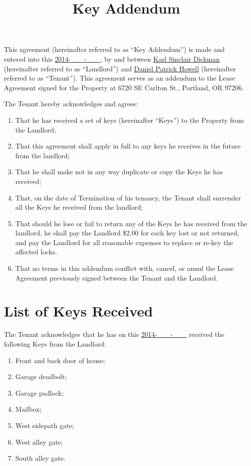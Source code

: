 \documentclass{amsart}
\title{Key Addendum}
\begin{document}
\maketitle
This agreement (hereinafter referred to as ``Key Addendum'') is made and entered
into this \underline{2014-\ \ \ \ -\ \ \ \ }, by and between \underline{Karl
Sinclair Dickman} (hereinafter referred to as ``Landlord'') and
\underline{Daniel Patrick Howell} (hereinafter referred to as ``Tenant''). This
agreement serves as an addendum to the Lease Agreement signed for the Property
at 6720 SE Carlton St., Portland, OR 97206.

The Tenant hereby acknowledges and agrees:
\begin{enumerate}
    \item That he has received a set of keys (hereinafter ``Keys'') to the Property
        from the Landlord;
    \item That this agreement shall apply in full to any keys he receives in the
        future from the landlord;
    \item That he shall make not in any way duplicate or copy the Keys he has
        received;
    \item That, on the date of Termination of his tenancy, the Tenant shall
        surrender all the Keys he received from the landlord;
    \item That should he lose or fail to return any of the Keys he has received
        from the landlord, he shall pay the Landlord \$2.00 for each key lost or
        not returned, and pay the Landlord for all reasonable expenses to
        replace or re-key the affected locks.
    \item That no terms in this addendum conflict with, cancel, or annul the
        Lease Agreement previously signed between the Tenant and the Landlord.
\end{enumerate}
\section*{List of Keys Received}
The Tenant acknowledges that he has on this \underline{2014-\ \ \ \ -\ \ \ \ }
received the following Keys from the Landlord:
\begin{enumerate}
    \item Front and back door of house;
    \item Garage deadbolt;
    \item Garage padlock;
    \item Mailbox;
    \item West sidepath gate;
    \item West alley gate;
    \item South alley gate.
\end{enumerate}
\end{document}
